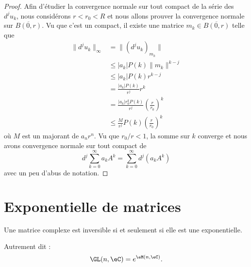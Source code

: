 \begin{proof}
	Afin d'étudier la convergence normale sur tout compact de la série des \( d^ju_k\), nous considérons \( r<r_0<R\) et nous allons prouver la convergence normale sur \( \overline{ B(0,r) }\). Vu que c'est un compact, il existe une matrice \( m_k\in\overline{ B(0,r) }\) telle que
	\begin{subequations}
		\begin{align}
			\| d^ju_k \|_{\infty} & =\| (d^ju_k)_{m_k} \|                                               \\
			                      & \leq | a_k |P(k)\| m_k \|^{k-j}                                     \\
			                      & \leq | a_k |P(k)r^{k-j}                                             \\
			                      & =\frac{ | a_k |P(k) }{ r^j }r^k                                     \\
			                      & =\frac{ | a_k |r_0^kP(k) }{ r^j }\left( \frac{ r }{ r_0 } \right)^k \\
			                      & \leq \frac{ M }{ r^j }P(k)\left( \frac{ r }{ r_0 } \right)^k
		\end{align}
	\end{subequations}
	où \( M\) est un majorant de \( a_nr^n\). Vu que \( r_0/r<1\), la somme sur \( k\) converge et nous avons convergence normale sur tout compact de
	\begin{equation}
		d^j\sum_{k=0}^{\infty}a_kA^k=\sum_{k=0}^{\infty}d^j(a_kA^k)
	\end{equation}
	avec un peu d'abus de notation.
\end{proof}

\section{Exponentielle de matrices}

\begin{proposition} \label{PropKKdmnkD}
	Une matrice complexe est inversible si et seulement si elle est une exponentielle.

	Autrement dit :
	\begin{equation}
		\GL(n,\eC)= e^{\eM(n,\eC)}.
	\end{equation}
\end{proposition}

